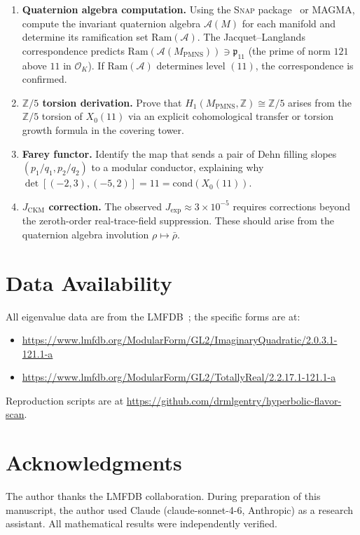 \documentclass[11pt,a4paper]{article}
\theoremstyle{definition}
\newcommand{\ZZ}{\mathbb{Z}}
\newcommand{\MPMNS}{M_{\mathrm{PMNS}}}
\begin{document}
\begin{enumerate}
\item \textbf{Quaternion algebra computation.}
  Using the \textsc{Snap} package~\cite{Snap} or MAGMA, compute
  the invariant quaternion algebra $\mathcal{A}(M)$ for each
  manifold and determine its ramification set $\mathrm{Ram}(\mathcal{A})$.
  The Jacquet--Langlands correspondence predicts
  $\mathrm{Ram}(\mathcal{A}(\MPMNS)) \ni \mathfrak{p}_{11}$
  (the prime of norm $121$ above $11$ in $\mathcal{O}_K$).
  If $\mathrm{Ram}(\mathcal{A})$ determines level $(11)$, the
  correspondence is confirmed.

\item \textbf{$\ZZ/5$ torsion derivation.}
  Prove that $H_1(\MPMNS,\ZZ) \cong \ZZ/5$ arises from the
  $\ZZ/5$ torsion of $X_0(11)$ via an explicit cohomological
  transfer or torsion growth formula in the covering tower.

\item \textbf{Farey functor.}
  Identify the map that sends a pair of Dehn filling slopes
  $(p_1/q_1, p_2/q_2)$ to a modular conductor, explaining
  why $\det[(-2,3),(-5,2)] = 11 = \mathrm{cond}(X_0(11))$.

\item \textbf{$J_{\mathrm{CKM}}$ correction.}
  The observed $J_{\mathrm{exp}} \approx 3\times10^{-5}$ requires
  corrections beyond the zeroth-order real-trace-field suppression.
  These should arise from the quaternion algebra involution
  $\rho \mapsto \bar\rho$.
\end{enumerate}

\section*{Data Availability}
All eigenvalue data are from the LMFDB~\cite{LMFDB}; the specific
forms are at:
\begin{itemize}
\item \url{https://www.lmfdb.org/ModularForm/GL2/ImaginaryQuadratic/2.0.3.1-121.1-a}
\item \url{https://www.lmfdb.org/ModularForm/GL2/TotallyReal/2.2.17.1-121.1-a}
\end{itemize}
Reproduction scripts are at
\url{https://github.com/drmlgentry/hyperbolic-flavor-scan}.

\section*{Acknowledgments}
The author thanks the LMFDB collaboration.
During preparation of this manuscript, the author used Claude
(claude-sonnet-4-6, Anthropic) as a research assistant.
All mathematical results were independently verified.
\end{document}
